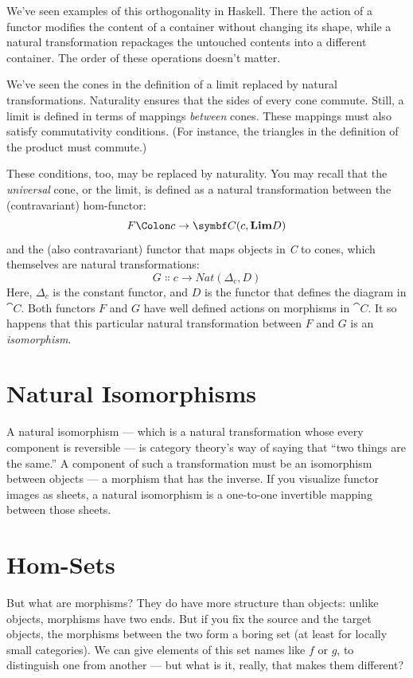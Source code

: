 \noindent
We've seen examples of this orthogonality in Haskell. There the action
of a functor modifies the content of a container without changing its
shape, while a natural transformation repackages the untouched contents
into a different container. The order of these operations doesn't
matter.

We've seen the cones in the definition of a limit replaced by natural
transformations. Naturality ensures that the sides of every cone
commute. Still, a limit is defined in terms of mappings \emph{between}
cones. These mappings must also satisfy commutativity conditions. (For
instance, the triangles in the definition of the product must commute.)

These conditions, too, may be replaced by naturality. You may recall
that the \emph{universal} cone, or the limit, is defined as a natural
transformation between the (contravariant) hom-functor:
\[F \Colon c \to \cat{C}(c, \Lim[D])\]
and the (also contravariant) functor that maps objects in \emph{C} to
cones, which themselves are natural transformations:
\[G \Colon c \to \mathit{Nat}(\Delta_c, D)\]
Here, $\Delta_c$ is the constant functor, and $D$ is the functor
that defines the diagram in $\cat{C}$. Both functors $F$ and
$G$ have well defined actions on morphisms in $\cat{C}$. It so
happens that this particular natural transformation between $F$
and $G$ is an \emph{isomorphism}.

\section{Natural Isomorphisms}

A natural isomorphism --- which is a natural transformation whose every
component is reversible --- is category theory's way of saying that
``two things are the same.'' A component of such a transformation must
be an isomorphism between objects --- a morphism that has the inverse.
If you visualize functor images as sheets, a natural isomorphism is a
one-to-one invertible mapping between those sheets.

\section{Hom-Sets}

But what are morphisms? They do have more structure than objects: unlike
objects, morphisms have two ends. But if you fix the source and the
target objects, the morphisms between the two form a boring set (at
least for locally small categories). We can give elements of this set
names like $f$ or $g$, to distinguish one from another ---
but what is it, really, that makes them different?

